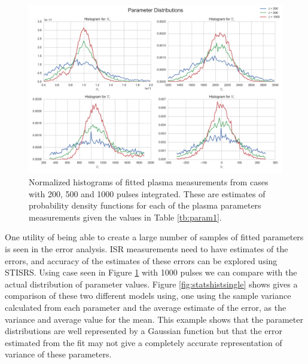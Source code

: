 \documentclass[draft,ras]{agutex}
\begin{document}
\begin{article}
\begin{figure}[!t]
\centering
\includegraphics[width=5in]{datahist}
\caption{Normalized histograms of fitted plasma measurements from cases with 200, 500 and 1000 pulses integrated. These are estimates of probability density functions for each of the plasma parameters measurements given the values in Table \ref{tb:param1}.}
\label{fig:statshistall}
\end{figure}

One utility of being able to create a large number of samples of fitted parameters is seen in the error analysis. ISR measurements need to have estimates of the errors, and accuracy of the estimates of these errors can be explored using STISRS. Using case seen in Figure \ref{fig:statshistall} with 1000 pulses we can compare with the actual distribution of parameter values. Figure \ref{fig:statshistsingle} shows gives a comparison of these two different models using, one using the sample variance calculated from each parameter and the average estimate of the error, as the variance and average value for the mean. This example shows that the parameter distributions are well represented by a Gaussian function but that the error estimated from the fit may not give a completely accurate representation of variance of these parameters. 


\end{article}
\end{document}
